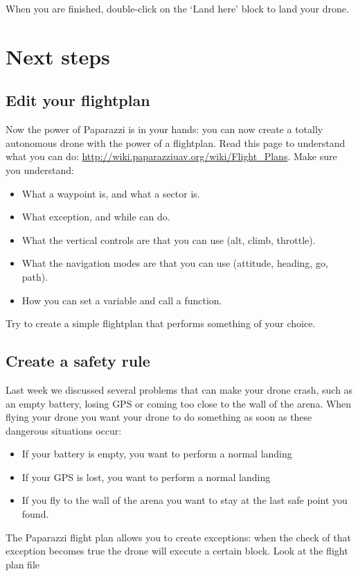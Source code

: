 \documentclass{article}
\begin{document}
\medskip
When you are finished, double-click on the `Land here' block to land your drone.



\section*{Next steps}
\subsection*{Edit your flightplan}
Now the power of Paparazzi is in your hands: you can now create a totally autonomous drone with the power of a flightplan. Read this page to understand what you can do: \url{http://wiki.paparazziuav.org/wiki/Flight_Plans}. 
Make sure you understand:
\begin{itemize}
	\item What a waypoint is, and what a sector is. 
	\item What exception, and while can do. 
	\item What the vertical controls are that you can use (alt, climb, throttle).
	\item What the navigation modes are that you can use (attitude, heading, go, path). 
	\item How you can set a variable and call a function. 
\end{itemize}

Try to create a simple flightplan that performs something of your choice. 

\subsection*{Create a safety rule}
Last week we discussed several problems that can make your drone crash, such as an empty battery, losing GPS or coming too close to the wall of the arena.
When flying your drone you want your drone to do something as soon as these dangerous situations occur:
\begin{itemize}
\item If your battery is empty, you want to perform a normal landing
\item If your GPS is lost, you want to perform a normal landing
\item If you fly to the wall of the arena you want to stay at the last safe point you found. 
\end{itemize}
The Paparazzi flight plan allows you to create exceptions: when the check of that exception becomes true the drone will execute a certain block. Look at the flight plan file 
\end{document}
